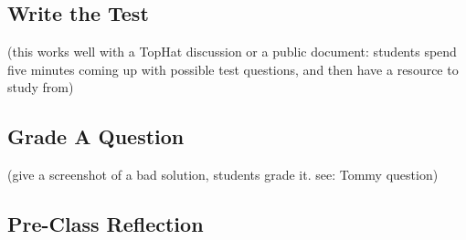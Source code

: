 {{\mypage
\subsection*{Write the Test}
(this works well with a TopHat discussion or a public document: 
students spend five minutes coming up with possible test questions, 
and then have a resource to study from)

\mypage
\subsection*{Grade A Question}
(give a screenshot of a bad solution, students grade it. 
see: Tommy question)

\mypage
\subsection*{Pre-Class Reflection}

}
}


\addblanktoolboxitem
\addblanktoolboxitem
\addblanktoolboxitem
\addblanktoolboxitem
\addblanktoolboxitem
